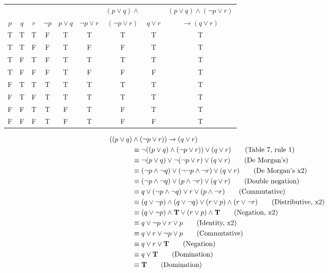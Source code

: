 \documentclass[12pt,addpoints]{exam}
\begin{document}
\begin{questions}
	\begin{solution}
   \begin{tabular}{ccc|cccccc}
         &     &     &          &            &                 & $(p
         \vee q) \wedge$ & & $(p \vee q) \wedge (\neg p \vee r)$ \\
     $p$ & $q$ & $r$ & $\neg p$ & $p \vee q$ & $\neg p \vee r$ &
     $(\neg p \vee r)$ & $q \vee r$ & $\rightarrow (q \vee r)$ \\
     \hline
     T & T & T & F & T & T & T & T & T\\
     T & T & F & F & T & F & F & T & T\\
     T & F & T & F & T & T & T & T & T\\
     T & F & F & F & T & F & F & F & T\\
     F & T & T & T & T & T & T & T & T\\
     F & T & F & T & T & T & T & T & T\\
     F & F & T & T & F & T & F & T & T\\
     F & F & F & T & F & T & F & F & T\\
   \end{tabular}

   \begin{align*}
        ((p \vee q) & \wedge (\neg p \vee r)) \rightarrow (q \vee r)
        \notag \\
         & \equiv \neg ((p \vee q) \wedge (\neg p \vee r)) \vee (q
         \vee r) \tag{Table 7, rule 1} \\
         & \equiv \neg (p \vee q) \vee \neg (\neg p \vee r) \vee (q
         \vee r) \tag{De Morgan's} \\
         & \equiv (\neg p \wedge \neg q) \vee (\neg \neg p \wedge
         \neg r) \vee (q \vee r) \tag{De Morgan's x2} \\
         & \equiv (\neg p \wedge \neg q) \vee (p \wedge
         \neg r) \vee (q \vee r) \tag{Double negation} \\
         & \equiv q \vee (\neg p \wedge \neg q) \vee r \vee (p \wedge
         \neg r) \tag{Commutative} \\
         & \equiv (q \vee \neg p) \wedge (q \vee \neg q) \vee (r
         \vee p) \wedge (r \vee \neg r) \tag{Distributive, x2}\\
         & \equiv (q \vee \neg p) \wedge {\bf T} \vee (r \vee p)
         \wedge {\bf T} \tag{Negation, x2} \\
         & \equiv q \vee \neg p \vee r \vee p \tag{Identity, x2} \\
         & \equiv q \vee r \vee \neg p \vee p \tag{Commutative} \\
         & \equiv q \vee r \vee {\bf T} \tag{Negation} \\
         & \equiv q \vee {\bf T} \tag{Domination} \\
         & \equiv {\bf T} \tag{Domination}
   \end{align*}
   \end{solution}




\end{questions}
\end{document}
